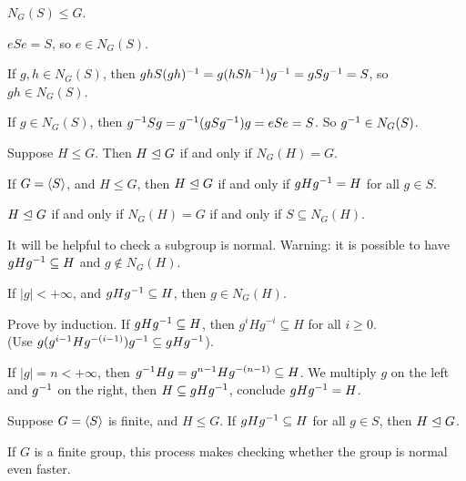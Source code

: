 \begin{lemma}
	$N_G(S)\le G$.
\end{lemma}

\begin{pf}
$eSe=S$, so $e\in N_G(S)$.

If $g,h\in N_G(S)$, then $ghS(gh)^{-1} = g(hSh^{-1})g^{-1} = gSg^{-1}=S$, so $gh\in N_G(S)$.

If $g\in N_G(S)$, then $g^{-1} Sg=g^{-1} (gSg^{-1})g=eSe=S$. So $g^{-1} \in N_G(S)$.
\end{pf}

\begin{lemma}
Suppose $H\le G$. Then $H\trianglelefteq G$ if and only if $N_G(H)=G$.
\end{lemma}

\begin{corr}
	If $G=\left\langle S \right\rangle$, and $H\le G$, then $H\trianglelefteq G$  if and only if $gHg^{-1} = H$ for all $g\in S$. 
\end{corr}

\begin{pf}
	$H\trianglelefteq G$ if and only if  $N_G(H)= G$ if and only if $S\subseteq N_G(H)$.
\end{pf}

\begin{remark}
It will be helpful to check a subgroup is normal. Warning: it is possible to have $gHg^{-1} \subseteq H$ and $g\not\in N_G(H)$.
\end{remark}

\begin{lemma}
If $|g|<+\infty$, and $gHg^{-1} \subseteq H$, then $g\in N_G(H)$.
\end{lemma}

\begin{pf}
Prove by induction. If $gHg^{-1} \subseteq H$, then $g^iH g^{-i}\subseteq H$ for all $i\ge 0$. 
\\(Use $g(g^{i-1}Hg^{-(i-1)})g^{-1} \subseteq gHg^{-1}$).

If $|g|=n<+\infty$, then $g^{-1} Hg=g^{n-1}Hg^{-(n-1)}\subseteq H$. We multiply $g$ on the left and $g^{-1}$ on the right, then $H\subseteq gHg^{-1}$, conclude $gHg^{-1} = H$.
\end{pf}

\begin{corr}
Suppose $G=\left\langle S \right\rangle$ is finite, and $H\le G$. If $gHg^{-1}\subseteq H$ for all $g\in S$, then $H\trianglelefteq G$.
\end{corr}

\begin{remark}
If $G$ is a finite group, this process makes checking whether the group is normal even faster.
\end{remark}

